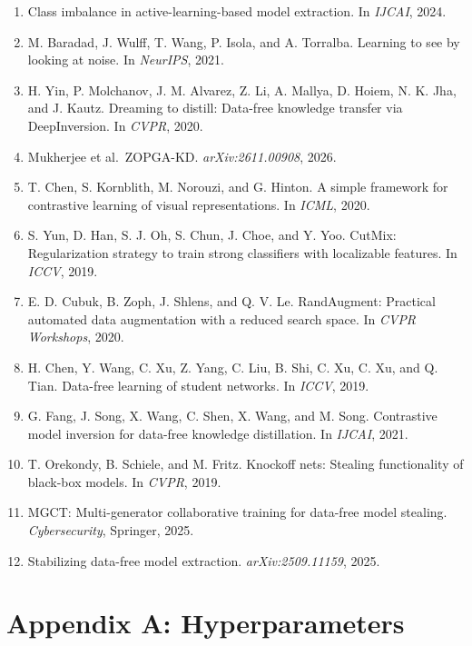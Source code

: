 \documentclass[
  10pt,
]{article}
\begin{document}
\begin{enumerate}
  public data. In \emph{AAAI}, 2020.
\item
  Class imbalance in active-learning-based model extraction. In
  \emph{IJCAI}, 2024.
\item
  M. Baradad, J. Wulff, T. Wang, P. Isola, and A. Torralba. Learning to
  see by looking at noise. In \emph{NeurIPS}, 2021.
\item
  H. Yin, P. Molchanov, J. M. Alvarez, Z. Li, A. Mallya, D. Hoiem, N. K.
  Jha, and J. Kautz. Dreaming to distill: Data-free knowledge transfer
  via DeepInversion. In \emph{CVPR}, 2020.
\item
  Mukherjee et al.~ZOPGA-KD. \emph{arXiv:2611.00908}, 2026.
\item
  T. Chen, S. Kornblith, M. Norouzi, and G. Hinton. A simple framework
  for contrastive learning of visual representations. In \emph{ICML},
  2020.
\item
  S. Yun, D. Han, S. J. Oh, S. Chun, J. Choe, and Y. Yoo. CutMix:
  Regularization strategy to train strong classifiers with localizable
  features. In \emph{ICCV}, 2019.
\item
  E. D. Cubuk, B. Zoph, J. Shlens, and Q. V. Le. RandAugment: Practical
  automated data augmentation with a reduced search space. In \emph{CVPR
  Workshops}, 2020.
\item
  H. Chen, Y. Wang, C. Xu, Z. Yang, C. Liu, B. Shi, C. Xu, C. Xu, and Q.
  Tian. Data-free learning of student networks. In \emph{ICCV}, 2019.
\item
  G. Fang, J. Song, X. Wang, C. Shen, X. Wang, and M. Song. Contrastive
  model inversion for data-free knowledge distillation. In \emph{IJCAI},
  2021.
\item
  T. Orekondy, B. Schiele, and M. Fritz. Knockoff nets: Stealing
  functionality of black-box models. In \emph{CVPR}, 2019.
\item
  MGCT: Multi-generator collaborative training for data-free model
  stealing. \emph{Cybersecurity}, Springer, 2025.
\item
  Stabilizing data-free model extraction. \emph{arXiv:2509.11159}, 2025.
\end{enumerate}

\hypertarget{appendix-a-hyperparameters}{%
\section*{Appendix A:
Hyperparameters}\label{appendix-a-hyperparameters}}
\end{document}
